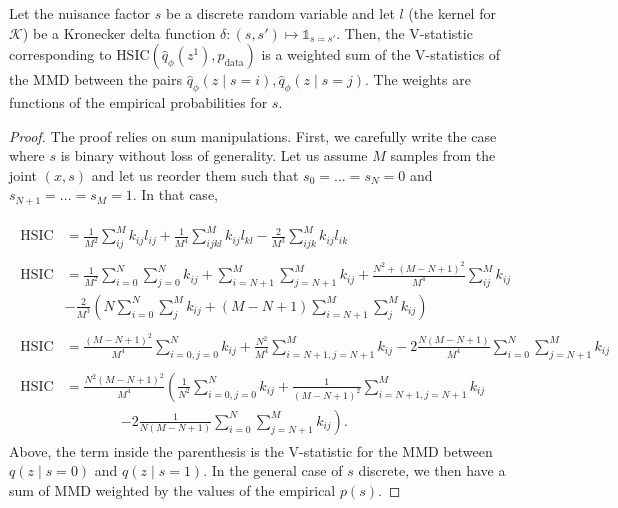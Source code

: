 \begin{thm}
\label{hsicmmd_hsic}
Let the nuisance factor $s$ be a discrete random variable and let $l$ (the kernel for $\mathcal{K}$) be a Kronecker delta function $\delta: (s, s') \mapsto \mathds{1}_{s = s'}$. Then, the V-statistic corresponding to $\textrm{HSIC}
(\hat{q}_\phi(z^1), p_{\text{data}})$ is a weighted sum of the V-statistics of the MMD between the pairs $\hat{q}_\phi(z \mid s=i), \hat{q}_\phi(z \mid s=j)$. The weights are functions of the empirical probabilities for $s$.
\end{thm}
\begin{proof}
     The proof relies on sum manipulations. First, we carefully write the case where $s$ is binary without loss of generality. Let us assume $M$ samples from the joint $(x, s)$ and let us reorder them such that $s_0 = ... = s_N = 0$ and $s_{N+1} = ... = s_M = 1$. In that case,
     
     \begin{align*}
     \begin{split}
          \textrm{HSIC} &=  \frac{1}{M^2}\sum_{ij}^M k_{ij}l_{ij} + \frac{1}{M^4}\sum_{ijkl}^M k_{ij}l_{kl} - \frac{2}{M^3}\sum_{ijk}^M k_{ij}l_{ik} \\ ~ \\
          \textrm{HSIC} &= \frac{1}{M^2}\sum_{i=0}^N\sum_{j=0}^N k_{ij} + \sum_{i=N+1}^M\sum_{j=N+1}^M k_{ij} + \frac{N^2 + (M-N+1)^2}{M^4}\sum_{ij}^M k_{ij} \\
     &- \frac{2}{M^3}\left(N \sum_{i=0}^N \sum_j^M k_{ij} + (M-N+1) \sum_{i=N+1}^M \sum_j^M k_{ij} \right) \\ ~ \\
     \textrm{HSIC} &= \frac{(M-N+1)^2}{M^4} \sum_{i=0, j=0}^Nk_{ij} + \frac{N^2}{M^4} \sum_{i=N+1, j=N+1}^M k_{ij} -2 \frac{N(M-N+1)}{M^4} \sum_{i=0}^N\sum_{j=N+1}^M k_{ij} \\~\\
     \textrm{HSIC} &= \frac{N^2(M-N+1)^2}{M^4} \left( \frac{1}{N^2}\sum_{i=0, j=0}^Nk_{ij} + \frac{1}{(M-N+1)^2} \sum_{i=N+1, j=N+1}^M k_{ij}\right.  \\
     &\qquad\qquad  \left. -2 \frac{1}{N(M-N+1)} \sum_{i=0}^N\sum_{j=N+1}^M k_{ij}\right).
     \end{split}
     \end{align*}
     Above,  the term inside the parenthesis is the V-statistic for the MMD between $q(z \mid  s=0)$ and $q(z \mid s=1)$. In the general case of $s$ discrete, we then have a sum of MMD weighted by the values of the empirical $p(s)$.
     \end{proof}

